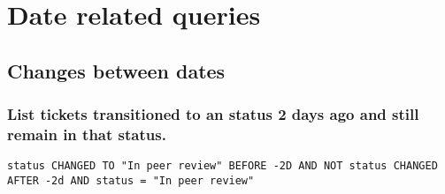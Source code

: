 \newpage
\section{Date related queries}

\subsection{Changes between dates}

\subsubsection*{List tickets transitioned to an status 2 days ago and still remain in that status.}

\begin{small}
    \begin{lstlisting}[language=jql]
    status CHANGED TO "In peer review" BEFORE -2D AND NOT status CHANGED AFTER -2d AND status = "In peer review"
    \end{lstlisting}
\end{small}